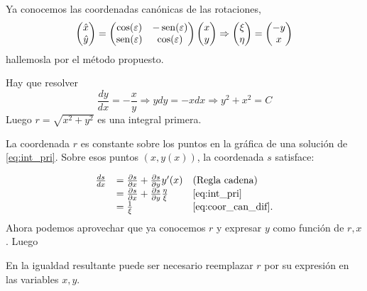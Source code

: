 \begin{ejemplo} Ya conocemos las coordenadas canónicas de las rotaciones,
 \[
 \begin{pmatrix} \hat{x}\\ \hat{y}
\end{pmatrix}=\begin{pmatrix} \cos(\varepsilon) & -\operatorname{sen}(\varepsilon)
\\ \operatorname{sen}(\varepsilon) & \cos(\varepsilon)
\end{pmatrix} \begin{pmatrix} x\\ y
\end{pmatrix}\Rightarrow  \begin{pmatrix} \xi\\ \eta
\end{pmatrix}= \begin{pmatrix} -y\\ x
\end{pmatrix}
\]
hallemosla por el método propuesto.
\end{ejemplo}
Hay que resolver
\[\frac{dy}{dx}=-\frac{x}{y}\Rightarrow ydy=-xdx\Rightarrow y^2+x^2=C\]
Luego $r=\sqrt{x^2+y^2}$ es una integral primera. 



La coordenada $r$ es constante sobre los puntos en la gráfica de una solución de \eqref{eq:int_pri}. Sobre esos puntos $(x,y(x))$, la coordenada $s$ satisface:

\begin{equation} \label{eq:coor_can_s}
\begin{array}{lll}
\frac{ds}{dx}&=\frac{\partial s}{\partial x}+\frac{\partial s}{\partial y} y'(x) & \hbox{(Regla cadena)}\\
&=\frac{\partial s}{\partial x}+\frac{\partial s}{\partial y} \frac{\eta}{\xi} &
  \eqref{eq:int_pri}\\
&=\frac{1}{\xi} &\hbox{\eqref{eq:coor_can_dif}}.
\end{array}
\end{equation}
Ahora podemos aprovechar que ya conocemos $r$ y  expresar $y$ como función de $r,x$. Luego

\begin{teorema}
\end{teorema}
 

En la igualdad resultante puede ser necesario reemplazar $r$ por su expresión en las variables $x,y$.


